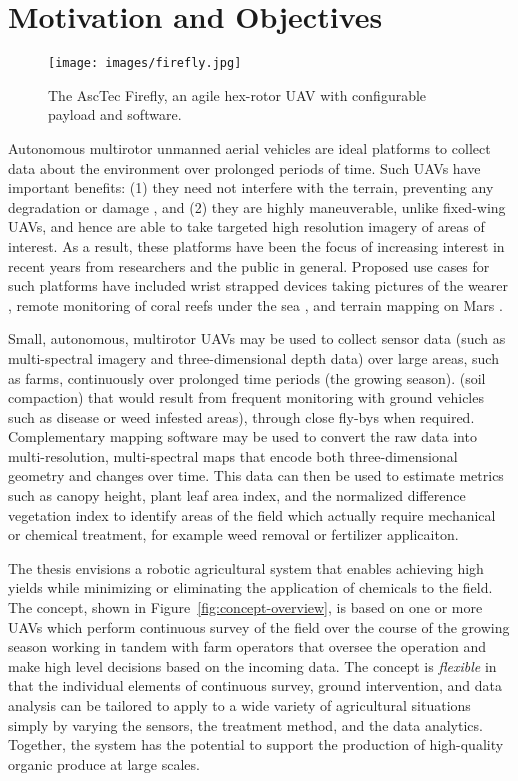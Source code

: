 \section{Motivation and Objectives}
\label{sec:Motivation and Objectives}

\begin{figure}[t]
 	 \centering
  	\texttt{[image: images/firefly.jpg]}
	  \caption{The AscTec Firefly, an agile hex-rotor UAV with configurable payload and software.}
	  \label{fig:firefly}
\end{figure}

Autonomous multirotor unmanned aerial vehicles are ideal platforms to collect data about the environment over prolonged periods of time. Such UAVs have important benefits: (1) they need not interfere with the terrain, preventing any degradation or damage , and (2) they are highly maneuverable, unlike fixed-wing UAVs, and hence are able to take targeted high resolution imagery of areas of interest. As a result, these platforms have been the focus of increasing interest in recent years from researchers and the public in general. Proposed use cases for such platforms have included wrist strapped devices taking pictures of the wearer \cite{Web:Nixie}, remote monitoring of coral reefs under the sea \cite{Web:fluidlensing}, and terrain mapping on Mars \cite{Web:nasadrone}.


\iffalse
Small, autonomous, multirotor UAVs may be used to collect sensor data (such as multi-spectral imagery and three-dimensional depth data) over large areas, such as farms, continuously over prolonged time periods (the growing season). (soil compaction) that would result from frequent monitoring with ground vehicles such as disease or weed infested areas), through close fly-bys when required. Complementary mapping software may be used to convert the raw data into multi-resolution, multi-spectral maps that encode both three-dimensional geometry and changes over time. This data can then be used to estimate metrics such as canopy height, plant leaf area index, and the normalized difference vegetation index to identify areas of the field which actually require mechanical or chemical treatment, for example weed removal or fertilizer applicaiton.

The thesis envisions a robotic agricultural system that enables achieving high yields while minimizing or eliminating the application of chemicals to the field. The concept, shown in Figure~\ref{fig:concept-overview}, is based on one or more UAVs which perform continuous survey of the field over the course of the growing season working in tandem with farm operators that oversee the operation and make high level decisions based on the incoming data. The concept is {\em flexible} in that the individual elements of continuous survey, ground intervention, and data analysis can be tailored to apply to a wide variety of agricultural situations simply by varying the sensors, the treatment method, and the data analytics. Together, the system has the potential to support the production of high-quality organic produce at large scales.

